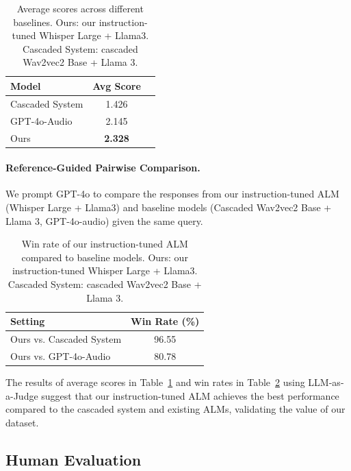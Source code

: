 \documentclass[11pt]{article}
\begin{document}
\begin{table}[ht]
\centering
\small
\begin{tabular}{lcc}
\toprule
\textbf{Model} & \textbf{Avg Score} \\
\midrule
Cascaded System & 1.426 \\
GPT-4o-Audio & 2.145 \\
Ours & \textbf{2.328} \\
\bottomrule
\end{tabular}
\caption{Average scores across different baselines. Ours: our instruction-tuned Whisper Large + Llama3. Cascaded System: cascaded Wav2vec2 Base + Llama 3.}
\label{tab:avg_score_comparison}
\vspace{-2mm}
\end{table}

\paragraph{Reference-Guided Pairwise Comparison.} We prompt GPT-4o to compare the responses from our instruction-tuned ALM (Whisper Large + Llama3) and baseline models (Cascaded Wav2vec2 Base + Llama 3, GPT-4o-audio) given the same query. 

\begin{table}[ht]
\centering
\small
\begin{tabular}{lc}
\toprule
\textbf{Setting} & \textbf{Win Rate (\%)} \\
\midrule
Ours  vs. Cascaded System & 96.55 \\
Ours vs. GPT-4o-Audio & 80.78 \\
\bottomrule
\end{tabular}
\caption{Win rate of our instruction-tuned ALM compared to baseline models. Ours: our instruction-tuned Whisper Large + Llama3. Cascaded System: cascaded Wav2vec2 Base + Llama 3.}
\label{tab:win_rate_comparison}
\vspace{-2mm}
\end{table}

The results of average scores in Table~\ref{tab:avg_score_comparison} and win rates in Table~\ref{tab:win_rate_comparison} using LLM-as-a-Judge suggest that our instruction-tuned ALM achieves the best performance compared to the cascaded system and existing ALMs, validating the value of our dataset.

\subsection{Human Evaluation}
\end{document}
